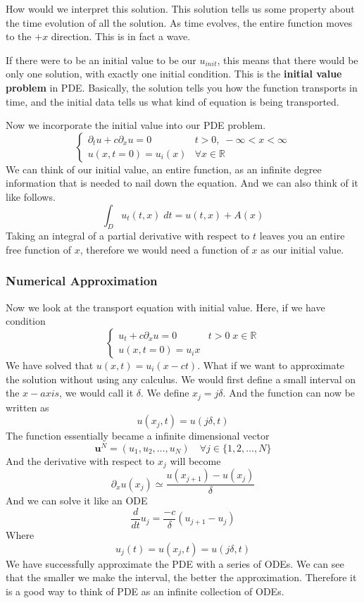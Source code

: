 \documentclass[12pt]{book}
\newcommand{\R}{\mathbb{R}}
\newcommand{\dydx}[2]{\frac{d #1}{d #2}}
\newcommand{\paren}[1]{\left( #1 \right)}
\begin{document}
How would we interpret this solution. This solution tells us some property about the time evolution of all the solution. As time evolves, the entire function moves to the $+x$ direction. This is in fact a wave. 

If there were to be an initial value to be our $u_{init}$, this means that there would be only one solution, with exactly one initial condition. This is the \textbf{initial value problem} in PDE. Basically, the solution tells you how the function transports in time, and the initial data tells us what kind of equation is being transported. 

Now we incorporate the initial value into our PDE problem. 
\[
\begin{cases}
    \partial_t u + c\partial_x u = 0 & t>0,\; -\infty < x < \infty\\
    u(x,t=0)=u_{i}(x) &\forall x \in \R
\end{cases}
\]
We can think of our initial value, an entire function, as an infinite degree information that is needed to nail down the equation. And we can also think of it like follows.
\[
\int_D u_t(t,x) \; dt = u(t,x) + A(x)
\]
Taking an integral of a partial derivative with respect to $t$ leaves you an entire free function of $x$, therefore we would need a function of $x$ as our initial value. 

\subsubsection{Numerical Approximation}
Now we look at the transport equation with initial value. Here, if we have condition
\[
\begin{cases}
    u_t+c\partial_x u = 0 & t>0 \; x\in \R\\
    u(x,t=0) = u_i{x}
\end{cases}
\]
We have solved that $u(x,t) = u_i(x-ct)$. What if we want to approximate the solution without using any calculus. We would first define a small interval on the $x-axis$, we would call it $\delta$. We define $x_j = j\delta$. And the function can now be written as
\[
u(x_j,t) = u(j\delta,t)
\]
The function essentially became a infinite dimensional vector
\[
\mathbf{u}^{N} = \paren{u_1,u_2,\ldots,u_N} \quad \forall j \in \{1,2,\ldots,N\}
\]
And the derivative with respect to $x_j$ will become
\[
\partial_x u(x_j) \simeq \frac{u(x_{j+1})-u(x_j)}{\delta}
\]
And we can solve it like an ODE
\[
\dydx{}{t}u_j = \frac{-c}{\delta}(u_{j+1}-u_j)
\]
Where
\[
u_j(t) = u(x_j,t) = u(j\delta,t)
\]
We have successfully approximate the PDE with a series of ODEs. We can see that the smaller we make the interval, the better the approximation. Therefore it is a good way to think of PDE as an infinite collection of ODEs. 
\end{document}
